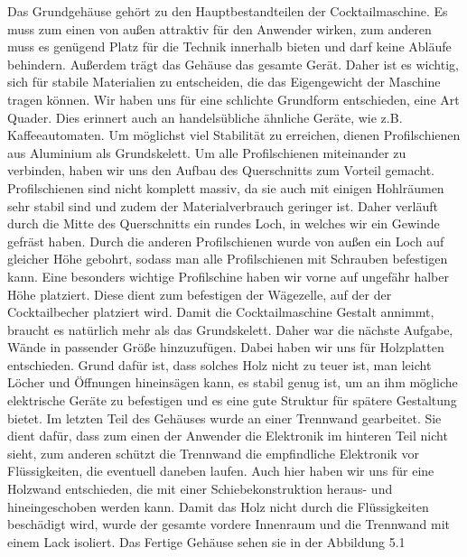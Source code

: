\documentclass[10pt,a4paper]{report}
\begin{document}
	Das Grundgehäuse gehört zu den Hauptbestandteilen der Cocktailmaschine. Es muss zum einen von außen attraktiv für den Anwender wirken, zum anderen muss es genügend Platz für die Technik innerhalb bieten und darf keine Abläufe behindern. Außerdem trägt das Gehäuse das gesamte Gerät. Daher ist es wichtig, sich für stabile Materialien zu entscheiden, die das Eigengewicht der Maschine tragen können.
	Wir haben uns für eine schlichte Grundform entschieden, eine Art Quader. Dies erinnert auch an handelsübliche ähnliche Geräte, wie z.B. Kaffeeautomaten. Um möglichst viel Stabilität zu erreichen, dienen Profilschienen aus Aluminium als Grundskelett. Um alle Profilschienen miteinander zu verbinden, haben wir uns den Aufbau des Querschnitts zum Vorteil gemacht. Profilschienen sind nicht komplett massiv, da sie auch mit einigen Hohlräumen sehr stabil sind und zudem der Materialverbrauch geringer ist. Daher verläuft durch die Mitte des Querschnitts ein rundes Loch, in welches wir ein Gewinde gefräst haben. Durch die anderen Profilschienen wurde von außen ein Loch auf gleicher Höhe gebohrt, sodass man alle Profilschienen mit Schrauben befestigen kann. Eine besonders wichtige Profilschine haben wir vorne auf ungefähr halber Höhe platziert. Diese dient zum befestigen der Wägezelle, auf der der Cocktailbecher platziert wird.
	Damit die Cocktailmaschine Gestalt annimmt, braucht es natürlich mehr als das Grundskelett. Daher war die nächste Aufgabe, Wände in passender Größe hinzuzufügen. Dabei haben wir uns für Holzplatten entschieden. Grund dafür ist, dass solches Holz nicht zu teuer ist, man leicht Löcher und Öffnungen hineinsägen kann, es stabil genug ist, um an ihm mögliche elektrische Geräte zu befestigen und es eine gute Struktur für spätere Gestaltung bietet. 
	Im letzten Teil des Gehäuses wurde an einer Trennwand gearbeitet. Sie dient dafür, dass zum einen der Anwender die Elektronik im hinteren Teil nicht sieht, zum anderen schützt die Trennwand die empfindliche Elektronik vor Flüssigkeiten, die eventuell daneben laufen. Auch hier haben wir uns für eine Holzwand entschieden, die mit einer Schiebekonstruktion heraus- und hineingeschoben werden kann. Damit das Holz nicht durch die Flüssigkeiten beschädigt wird, wurde der gesamte vordere Innenraum und die Trennwand mit einem Lack isoliert. Das Fertige Gehäuse sehen sie in der Abbildung 5.1\\
	
\end{document}
